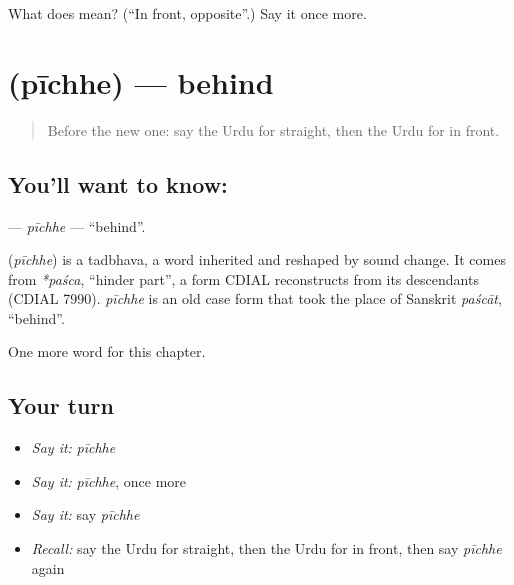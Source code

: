 \begin{tcolorbox}[breakable,colback=teal!4,colframe=teal!35!black,title={Before you move on}]
What does  mean? (\textquotedblleft{}In front, opposite\textquotedblright{}.) Say it once more.
\end{tcolorbox}
\section[\texorpdfstring{\ur{پیچھے} (pīchhe)}{پیچھے (pīchhe)}]{ (pīchhe) — behind}

\label{lesson:UR-C97-pichhe}



\begin{quote}
Before the new one: say the Urdu for straight, then the Urdu for in front.
\end{quote}

\subsection*{You'll want to know: }
\textbf{} — \emph{pīchhe} — \textquotedblleft{}behind\textquotedblright{}.

\begin{cousinweb}
\textbf{} (\emph{pīchhe}) is a tadbhava, a word inherited and reshaped by sound change. It comes from \emph{*paśca}, \textquotedblleft{}hinder part\textquotedblright{}, a form CDIAL reconstructs from its descendants (CDIAL 7990). \emph{pīchhe} is an old case form that took the place of Sanskrit \emph{paścāt}, \textquotedblleft{}behind\textquotedblright{}.
\end{cousinweb}

\begin{grammarlens}[title={What you've built}]
One more word for this chapter.
\end{grammarlens}

\subsection*{Your turn}
\begin{itemize}
\raggedright
  \item \emph{Say it:} \emph{pīchhe}
  \item \emph{Say it:} \emph{pīchhe}, once more
  \item \emph{Say it:} say \emph{pīchhe}
  \item \emph{Recall:} say the Urdu for straight, then the Urdu for in front, then say \emph{pīchhe} again
\end{itemize}

